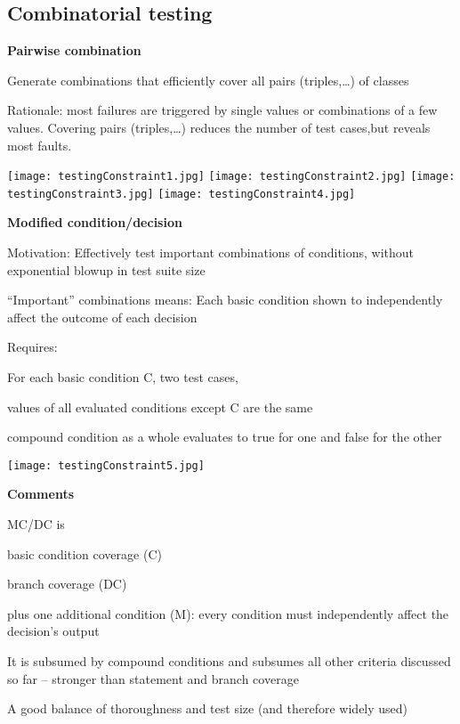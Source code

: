 \subsection{Combinatorial testing}
\textbf{Pairwise combination} 
\begin{itemize*}
	\item Generate combinations that efficiently cover all 	pairs (triples,…) of classes
	\item Rationale: most failures are triggered by single values or combinations of a few values. Covering pairs (triples,\ldots) reduces the number of test cases,but reveals most faults.
\end{itemize*}
\texttt{[image: testingConstraint1.jpg]}
\texttt{[image: testingConstraint2.jpg]}
\texttt{[image: testingConstraint3.jpg]}
\texttt{[image: testingConstraint4.jpg]}

\textbf{Modified condition/decision}
\begin{itemize*}
\item Motivation: Effectively test important combinations of conditions, without exponential blowup in test suite size 
\begin{itemize*} 
\item “Important” combinations means: Each basic condition shown to independently affect the outcome of each decision
\end{itemize*}
\item Requires:
\begin{itemize*}
\item For each basic condition C, two test cases,
\item values of all evaluated conditions except C are the same 
\item compound condition as a whole evaluates to true for one and false for the other
\end{itemize*}
\end{itemize*}

\texttt{[image: testingConstraint5.jpg]}

\textbf{Comments}
\begin{itemize*}
\item MC/DC is
\begin{itemize*}
\item basic condition coverage (C)
\item branch coverage (DC)
\item plus one additional condition (M): every condition must independently affect the decision's output
\end{itemize*}
\item It is subsumed by compound conditions and subsumes all other criteria discussed so far
– stronger than statement and branch coverage
\item A good balance of thoroughness and test size
(and therefore widely used)
\end{itemize*}

